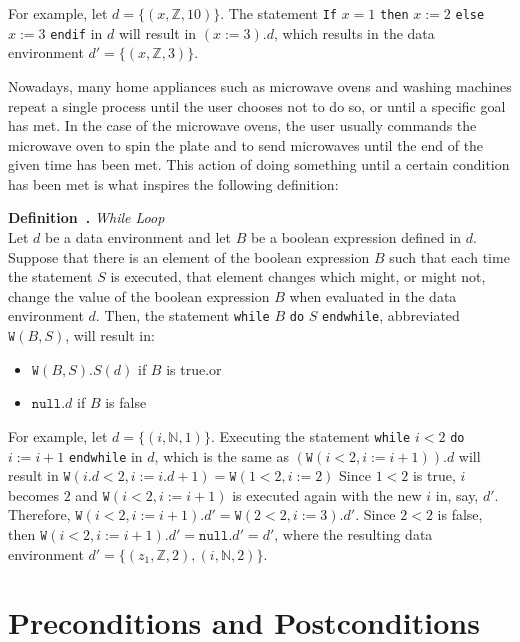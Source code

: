 \documentclass[11pt]{article}
\newcounter{definition}
\newenvironment{definition}[1][]{\stepcounter{definition}\par\medskip\noindent
\textbf{Definition~\thesection.\thedefinition #1} \rmfamily}{}
\newcounter{lemma}
\newcounter{theorem}
\newcounter{example}
\newcounter{case}
\newcounter{result}
\begin{document}
For example, let $d=\{(x,\mathbb{Z},10)\}$. The statement \texttt{If} $x=1$ \texttt{then} $x:=2$ \texttt{else} $x:=3$ \texttt{endif} in $d$ will result in $(x:=3).d$, which results in the data environment $d'=\{(x,\mathbb{Z},3)\}$.

Nowadays, many home appliances such as microwave ovens and washing machines repeat a single process until the user chooses not to do so, or until a specific goal has met. In the case of the microwave ovens, the user usually commands the microwave oven to spin the plate and to send microwaves until the end of the given time has been met. This action of doing something until a certain condition has been met is what inspires the following definition:

\begin{definition} \emph{While Loop} \\
Let $d$ be a data environment and let $B$ be a boolean expression defined in $d$. Suppose that there is an element of the boolean expression $B$ such that each time the statement $S$ is executed, that element changes which might, or might not, change the value of the boolean expression $B$ when evaluated in the data environment $d$. Then, the statement \texttt{while} $B$ \texttt{do} $S$ \texttt{endwhile}, abbreviated $\texttt{W}(B,S)$, will result in:
\begin{itemize}[noitemsep]
 \item $\texttt{W}(B,S).S(d)$ if $B$ is true.or
 \item $\texttt{null}.d$ if $B$ is false
\end{itemize}
\end{definition}

For example, let $d=\{(i,\mathbb{N},1)\}$. Executing the statement \texttt{while} $i<2$ \texttt{do} $i:=i+1$ \texttt{endwhile} in $d$, which is the same as $(\texttt{W}(i<2,i:=i+1)).d$  will result in  $\texttt{W}(i.d<2,i:=i.d+1)=\texttt{W}(1<2,i:=2)$ Since $1<2$ is true, $i$ becomes $2$ and $\texttt{W}(i<2,i:=i+1)$ is executed again with the new $i$ in, say, $d'$. Therefore, $\texttt{W}(i<2,i:=i+1).d'=\texttt{W}(2<2,i:=3).d'$. Since $2<2$ is false, then  $\texttt{W}(i<2,i:=i+1).d'=\texttt{null}.d'=d'$, where the resulting data environment $d'=\{(z_1,\mathbb{Z},2),(i,\mathbb{N},2)\}$.


\section{Preconditions and Postconditions}
\setcounter{definition}{0}
\setcounter{lemma}{0}
\setcounter{theorem}{0}
\setcounter{example}{0}
\end{document}
